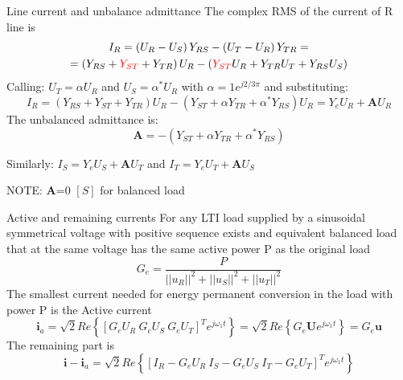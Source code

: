 \documentclass[aspectratio=169]{beamer}
\begin{document}
\begin{frame}{Line current and unbalance admittance}{\insertsection}
    The complex RMS of the current of R line is 
    \begin{gather}
        I_R = \left(U_R-U_S\right)Y_{RS} - \left(U_T-U_R\right)Y_{TR} = \notag \\
        = \left(Y_{RS} + \textcolor{red}{Y_{ST}} + Y_{TR}\right) U_R - \left(\textcolor{red}{Y_{ST}}U_R + Y_{TR}U_T + Y_{RS}U_S\right)
    \end{gather}
    Calling: $U_T = \alpha U_R$ and $U_S = \alpha^* U_R$ with $\alpha=1e^{j2/3\pi}$ and substituting:
    \begin{equation}
        I_R = \left(Y_{RS} + Y_{ST} + Y_{TR}\right) U_R - \left(Y_{ST} + \alpha Y_{TR} + \alpha^* Y_{RS}\right)U_R = Y_e U_R + \textbf{A} U_R
        \label{eq:I_R}
    \end{equation}
     The \textcolor{NTNU_orange}{unbalanced admittance} is:
    \begin{equation}
      \textbf{A} =-(Y_{ST} + \alpha Y_{TR} + \alpha^*Y_{RS} )
    \end{equation}

    Similarly: $I_S = Y_e U_S + \textbf{A} U_T$  and  $I_T = Y_e U_T + \textbf{A} U_S$

    NOTE: \textbf{A}=0 $\left[S\right]$ for balanced load
\end{frame}

\begin{frame}{Active and remaining currents}{\insertsection}
    For any LTI load supplied by a sinusoidal symmetrical voltage with positive sequence exists and equivalent balanced load that at the same voltage has the same active power P as the original load
    \begin{equation}
        G_e = \frac{P}{||u_R||^2 + ||u_S||^2 + ||u_T||^2} 
    \end{equation}
    The smallest current needed for energy permanent conversion in the load with power P is the \textcolor{NTNU_orange}{Active current}
    \begin{equation}
        \textbf{i}_a = \sqrt{2} Re\left\{\left[G_e U_R \ G_e U_S \ G_e U_T\right]^Te^{j\omega_1t}\right\} = \sqrt{2} Re\left\{G_e \textbf{U} e^{j\omega_1t} \right\} = G_e \textbf{u}
    \end{equation}
    The remaining part is 
    \begin{equation}
        \textbf{i} - \textbf{i}_a = \sqrt{2} Re\left\{\left[I_R - G_e U_R \ I_S -G_e U_S \ I_T - G_e U_T\right]^Te^{j\omega_1t}\right\}
        \label{eq:i_minus_ia}
    \end{equation}
    
\end{frame}
\end{document}
